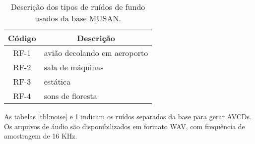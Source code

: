 \begin{table} [H]
    \centering
    \caption{Descrição dos tipos de ruídos de fundo usados da base MUSAN.}
    \label{tbl:noise-bg}
    \begin{tabular}{c|l}

        \multicolumn{1}{c|}{\textbf{Código}} & \multicolumn{1}{c}{\textbf{Descrição}} \\
        \hline 

        RF-1 & avião decolando em aeroporto \\
        RF-2 & sala de máquinas \\
        RF-3 & estática \\
        RF-4 & sons de floresta \\

    \end{tabular}
\end{table}

As tabelas \ref{tbl:noise} e \ref{tbl:noise-bg} indicam os ruídos separados da base para gerar AVCDs.
Os arquivos de áudio são disponibilizados em formato WAV, com frequência de amostragem de 16 KHz. 